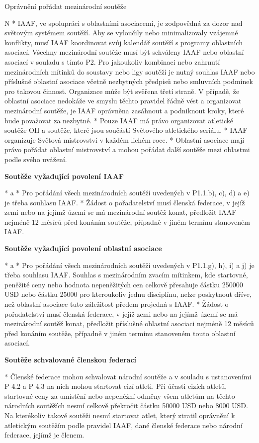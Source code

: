 \secc Oprávnění pořádat mezinárodní soutěže

\begitems \style N
* IAAF, ve spolupráci s oblastními asociacemi, je zodpovědná za dozor nad světovým systémem soutěží. Aby se vyloučily nebo minimalizovaly vzájemné konflikty, musí IAAF koordinovat svůj kalendář soutěží s programy oblastních asociací. Všechny mezinárodní soutěže musí být schváleny IAAF nebo oblastní asociací v souladu s tímto P2. Pro jakoukoliv kombinaci nebo zahrnutí mezinárodních mítinků do soustavy nebo ligy soutěží je nutný souhlas IAAF nebo příslušné oblastní asociace včetně nezbytných předpisů nebo smluvních podmínek pro takovou činnost. Organizace může být svěřena třetí straně. V případě, že oblastní asociace nedokáže ve smyslu těchto pravidel řádně vést a organizovat mezinárodní soutěže, je IAAF oprávněna zasáhnout a podniknout kroky, které bude považovat za nezbytné.
* Pouze IAAF má právo organizovat atletické soutěže OH a soutěže, které jsou součástí Světového atletického seriálu.
* IAAF organizuje Světová mistrovství v každém lichém roce.
* Oblastní asociace mají právo pořádat oblastní mistrovství a mohou pořádat další soutěže mezi oblastmi podle svého uvážení.

{\bf Soutěže vyžadující povolení IAAF}

* \begitems \style a
  * Pro pořádání všech mezinárodních soutěží uvedených v P1.1.b), c), d) a e) je třeba souhlasu IAAF.
  * Žádost o pořadatelství musí členská federace, v jejíž zemi nebo na jejímž území se má mezinárodní soutěž konat, předložit IAAF nejméně 12 měsíců před konáním soutěže, případně v jiném termínu stanoveném IAAF.
  \enditems

{\bf Soutěže vyžadující povolení oblastní asociace}

* \begitems \style a
  * Pro pořádání všech mezinárodních soutěží uvedených v P1.1.g), h), i) a j) je třeba souhlasu IAAF. Souhlas s mezinárodním zvacím mítinkem, kde startovné, peněžité ceny nebo hodnota nepeněžitých cen celkově přesahuje částku 250000 USD nebo částku 25000 pro kteroukoliv jednu disciplínu, nelze poskytnout dříve, než oblastní asociace tuto záležitost předem projedná s IAAF.
  * Žádost o pořadatelství musí členská federace, v jejíž zemi nebo na jejímž území se má mezinárodní soutěž konat, předložit příslušné oblastní asociaci nejméně 12 měsíců před konáním soutěže, případně v jiném termínu stanoveném touto oblastní asociací.
  \enditems

{\bf Soutěže schvalované členskou federací}

* Členské federace mohou schvalovat národní soutěže a v souladu s ustanoveními P 4.2 a P 4.3 na nich mohou startovat cizí atleti. Při účasti cizích atletů, startovné ceny za umístění nebo nepeněžní odměny všem atletům na těchto národních soutěžích nesmí celkově překročit částku 50000 USD nebo 8000 USD. Na kterékoliv takové soutěži nesmí startovat atlet, který ztratil oprávnění k atletickým soutěžím podle pravidel IAAF, dané členské federace nebo národní federace, jejímž je členem.
\enditems

